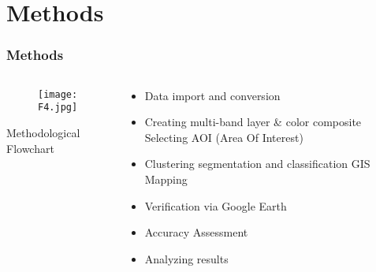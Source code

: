 \documentclass[pdflatex,compress,8pt,
	xcolor={dvipsnames,dvipsnames,svgnames,x11names,table},
	hyperref={colorlinks = true,
	breaklinks = true, 
	urlcolor = NavyBlue, 
	breaklinks = true}]{beamer}
\begin{document}
\section{Methods} 
\begin{frame}\frametitle{Methods}
\begin{minipage}[0.4\textheight]{\textwidth}
\begin{columns}[T]
\begin{column}{0.5\textwidth}
\vspace{2em}
\begin{figure}[H]
	\centering
		\texttt{[image: F4.jpg]}
\end{figure}
\footnotesize{Methodological Flowchart}
\end{column}
\begin{column}{0.5\textwidth}
\vspace{2em}  
\begin{itemize}
	\item Data import and conversion
	\item Creating multi-band layer \& color composite Selecting AOI (Area Of Interest)
	\item Clustering segmentation and classification GIS Mapping
	\item Verification via Google Earth
	\item Accuracy Assessment
	\item Analyzing results
\end{itemize}
\end{column}
\end{columns}
\end{minipage}
\end{frame}
\end{document}
